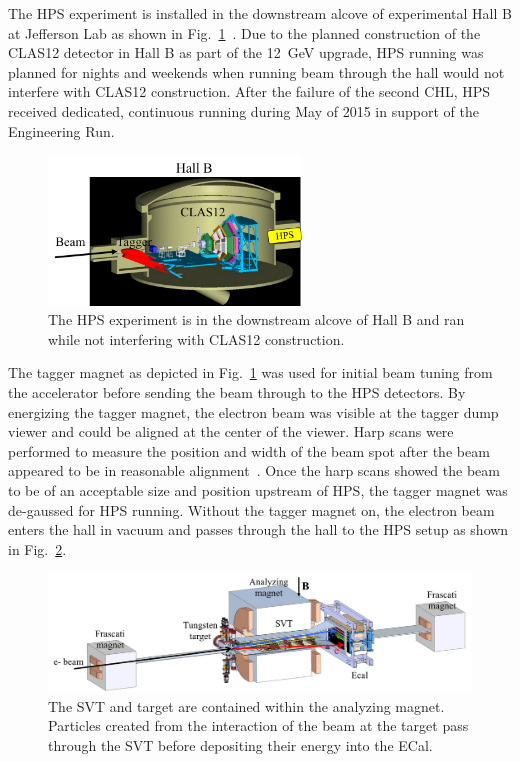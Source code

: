 The HPS experiment is installed in the downstream alcove of experimental Hall B at Jefferson Lab as shown in Fig.~\ref{Figure:hallB}~\cite{beamline_nim_2017}. Due to the planned construction of the CLAS12 detector in Hall B as part of the 12~GeV upgrade, HPS running was planned for nights and weekends when running beam through the hall would not interfere with CLAS12 construction. After the failure of the second CHL, HPS received dedicated, continuous running during May of 2015 in support of the Engineering Run. 

\begin{figure}[H]
  \centering
      \includegraphics[width=0.6\textwidth]{pics/experiment/hallB.png}
  \caption[HPS location in Hall B]{The HPS experiment is in the downstream alcove of Hall B and ran while not interfering with CLAS12 construction.}
  \label{Figure:hallB}
\end{figure}

The tagger magnet as depicted in Fig.~\ref{Figure:hallB} was used for initial beam tuning from the accelerator before sending the beam through to the HPS detectors. By energizing the tagger magnet, the electron beam was visible at the tagger dump viewer and could be aligned at the center of the viewer. Harp scans were performed to measure the position and width of the beam spot after the beam appeared to be in reasonable alignment~\cite{beamline_nim_2017}. Once the harp scans showed the beam to be of an acceptable size and position upstream of HPS, the tagger magnet was de-gaussed for HPS running. Without the tagger magnet on, the electron beam enters the hall in vacuum and passes through the hall to the HPS setup as shown in Fig.~\ref{Figure:hpsBeamline}. 

\begin{figure}[H]
  \centering
      \includegraphics[width=1.0\textwidth]{pics/experiment/hpsBeamline.png}
  \caption[HPS beamline]{The SVT and target are contained within the analyzing magnet. Particles created from the interaction of the beam at the target pass through the SVT before depositing their energy into the ECal.}
  \label{Figure:hpsBeamline}
\end{figure}

